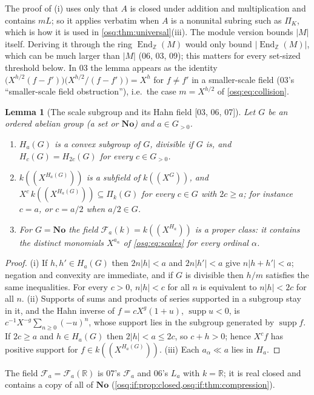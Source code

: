 \documentclass[11pt,letterpaper]{article}
\numberwithin{equation}{section}
\newtheorem{lemma}[lemma]{Lemma}
\theoremstyle{definition}
\theoremstyle{remark}
\theoremstyle{plain}
\newcommand{\No}{\mathbf{No}}
\newcommand{\Z}{\mathbb Z}
\newcommand{\R}{\mathbb R}
\newcommand{\FF}{\mathscr F}         %
\newcommand{\hahn}[2]{#1(\!(X^{#2})\!)}
\newcommand{\supp}{\operatorname{supp}}
\newcommand{\End}{\operatorname{End}}
\newcommand{\src}[1]{\textup{\textsf{[#1]}}}
\begin{document}
The proof of (i) uses only that $A$ is closed under addition and multiplication and contains
$mL$; so it applies verbatim when $A$ is a nonunital subring such as $\Pi_K$, which is how it is
used in \cref{osq:thm:universal}(iii). The module version bounds $|M|$ itself. Deriving it through the ring $\End_\Z(M)$ would
only bound $|\End_\Z(M)|$, which can be much larger than $|M|$ (06, 03, 09); this matters
for every set-sized threshold below. In 03 the lemma appears as the identity
$\bigl(X^{h/2}(f-f')\bigr)\bigl(X^{h/2}/(f-f')\bigr)=X^h$ for $f\neq f'$ in a
smaller-scale field (03's ``smaller-scale field obstruction''), i.e.\ the case
$m=X^{h/2}$ of \eqref{osq:eq:collision}.

\begin{lemma}[The scale subgroup and its Hahn field \src{03, 06, 07}]\label{osq:lem:Ha}
Let $G$ be an ordered abelian group (a set or $\No$) and $a\in G_{>0}$.
\begin{enumerate}
\item $H_a(G)$ is a convex subgroup of $G$, divisible if $G$ is, and
$H_{c}(G)=H_{2c}(G)$ for every $c\in G_{>0}$.
\item $\hahn k{H_a(G)}$ is a subfield of $\hahn kG$, and $X^c\,\hahn k{H_a(G)}\subseteq
\Pi_k(G)$ for every $c\in G$ with $2c\ge a$; for instance $c=a$, or $c=a/2$ when
$a/2\in G$.
\item For $G=\No$ the field $\FF_a(k)=\hahn k{H_a}$ is a proper class: it contains the
distinct monomials $X^{a_\alpha}$ of \eqref{osq:eq:scales} for every ordinal $\alpha$.
\end{enumerate}
\end{lemma}
\begin{proof}
(i) If $h,h'\in H_a(G)$ then $2n|h|<a$ and $2n|h'|<a$ give $n|h+h'|<a$; negation and
convexity are immediate, and if $G$ is divisible then $h/m$ satisfies the same inequalities.
For every $c>0$, $n|h|<c$ for all $n$ is equivalent to $n|h|<2c$ for all $n$.
(ii) Supports of sums and products of series supported in a subgroup stay in it, and the
Hahn inverse of $f=cX^g(1+u)$, $\supp u<0$, is $c^{-1}X^{-g}\sum_{n\ge0}(-u)^n$, whose
support lies in the subgroup generated by $\supp f$. If $2c\ge a$ and $h\in H_a(G)$ then
$2|h|<a\le 2c$, so $c+h>0$; hence $X^cf$ has positive support for
$f\in\hahn k{H_a(G)}$.
(iii) Each $a_\alpha\ll a$ lies in $H_a$.
\end{proof}

The field $\FF_a=\FF_a(\R)$ is 07's $\mathscr F_a$ and 06's $L_a$ with $k=\R$; it is
real closed and contains a copy of all of $\No$ (\cref{osq:if:prop:closed,osq:if:thm:compression}).
\end{document}
